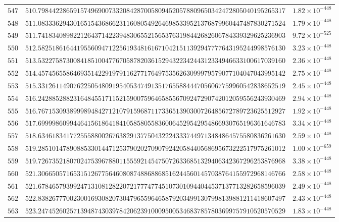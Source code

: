 \documentclass[12pt,reqno]{amsart}
\theoremstyle{remark}
\begin{document}
\begin{longtable}{clc}
$547$ & $510.7984422865915749690073320842870058094520578809650342472805040195265317$ & $1.82\times 10^{-448}$ \\
$548$ & $511.0833362943016515436866231160805492646985339521376879960447487830271524$ & $1.79\times 10^{-448}$ \\
$549$ & $511.7418340898221264371422394830655215653763198442682606784339329625236903$ & $9.72\times 10^{-525}$ \\
$550$ & $512.5825186164419556094712256193481616710421511392947777643195244998576130$ & $3.23\times 10^{-448}$ \\
$551$ & $513.5322758730084185100477670587820361529432234244312334946633100617039160$ & $2.36\times 10^{-448}$ \\
$552$ & $514.4574565586469351422919791162771764975356263099979579077104047043995142$ & $2.75\times 10^{-448}$ \\
$553$ & $515.3312611490762250548091954053474913517655884447056067759960542838652519$ & $2.45\times 10^{-448}$ \\
$554$ & $516.2428852882316484551711521590075964658556709247290742012059556243930469$ & $2.94\times 10^{-448}$ \\
$555$ & $516.7671530938999894842712107915968711733651390300726485672789723625512927$ & $1.92\times 10^{-448}$ \\
$556$ & $517.6999986099446415618641841058580558360064529542954866930765196361646783$ & $3.34\times 10^{-448}$ \\
$557$ & $518.6346183417725558800267638291377504322243337449713484864575580836261630$ & $2.59\times 10^{-448}$ \\
$558$ & $519.2851014789088533014471253790202709079242058440568695673222517975261012$ & $1.00\times 10^{-659}$ \\
$559$ & $519.7267352180702475396788011555921454750726336851329406342367296253876968$ & $3.38\times 10^{-448}$ \\
$560$ & $521.3066505716531512677564608087488688685162445601457038764155972968146766$ & $2.58\times 10^{-448}$ \\
$561$ & $521.6784657939924713108128220721777477451073010944044537137713282658596039$ & $2.49\times 10^{-448}$ \\
$562$ & $522.8382677700230016930820730479655964658792034991307998139881211418607497$ & $2.43\times 10^{-448}$ \\
$563$ & $523.2474526025713948743039784206239100095005346837857803699757910520570529$ & $1.83\times 10^{-448}$ \\

\end{longtable}
\end{document}
